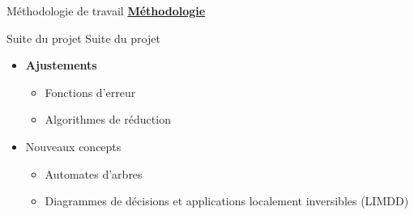 \documentclass[french, 12pt]{beamer}
\begin{document}
\begin{frame}{Méthodologie de travail}
\underline{\textbf{Méthodologie}}
\small{
\begin{center}
\end{center}
}
\end{frame}



\begin{frame}{Suite du projet}
Suite du projet
\begin{itemize}
    \item \textbf{Ajustements}
    \begin{itemize}
        \item Fonctions d'erreur
        \item Algorithmes de réduction
    \end{itemize}
    \item Nouveaux concepts
    \begin{itemize}
        \item Automates d'arbres
        \item Diagrammes de décisions et applications localement inversibles (LIMDD)
    \end{itemize}
\end{itemize}
\end{frame}
\end{document}
